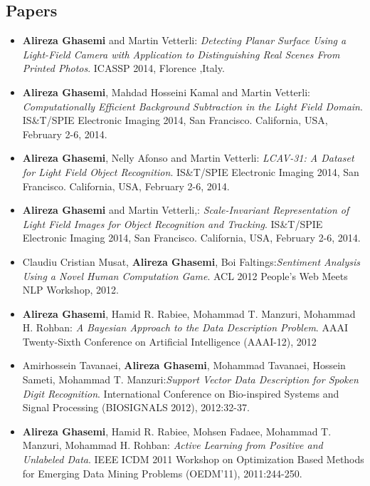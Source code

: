 \documentclass[a4paper]{article}
\theoremstyle{definition}
\begin{document}
\subsection{Papers}
\begin{itemize}

\item \textbf{Alireza Ghasemi} and Martin Vetterli:\textit{ Detecting Planar Surface Using a Light-Field Camera with Application
to Distinguishing Real Scenes From Printed Photos}.  ICASSP 2014, Florence ,Italy.

\item \textbf{Alireza Ghasemi}, Mahdad Hosseini Kamal  and Martin Vetterli:\textit{ Computationally Efficient Background Subtraction in the Light Field Domain}.  IS\&T/SPIE Electronic Imaging 2014, San Francisco. California, USA, February 2-6, 2014.

\item \textbf{Alireza Ghasemi}, Nelly Afonso  and Martin Vetterli:\textit{ LCAV-31: A Dataset for Light Field Object Recognition}.  IS\&T/SPIE Electronic Imaging 2014, San Francisco. California, USA, February 2-6, 2014.

\item \textbf{Alireza Ghasemi} and Martin Vetterli,:\textit{ Scale-Invariant Representation of Light Field Images for Object Recognition and Tracking}.  IS\&T/SPIE Electronic Imaging 2014, San Francisco. California, USA, February 2-6, 2014.



\item Claudiu Cristian Musat, \textbf{Alireza Ghasemi}, Boi Faltings:\textit{Sentiment Analysis Using a Novel Human Computation Game}.  ACL 2012 People's Web Meets NLP Workshop, 2012.

\item \textbf{Alireza Ghasemi}, Hamid R. Rabiee,  Mohammad T. Manzuri, Mohammad H. Rohban:\textit{ A Bayesian Approach to the Data Description Problem}.  AAAI Twenty-Sixth Conference on Artificial Intelligence (AAAI-12), 2012

\item Amirhossein Tavanaei,\textbf{ Alireza Ghasemi}, Mohammad Tavanaei, Hossein Sameti, Mohammad T. Manzuri:\textit{Support Vector Data Description for Spoken Digit Recognition}. International Conference on Bio-inspired Systems and Signal Processing (BIOSIGNALS 2012), 2012:32-37.

\item \textbf{Alireza Ghasemi}, Hamid R. Rabiee, Mohsen Fadaee, Mohammad T. Manzuri, Mohammad H. Rohban:\textit{ Active Learning from Positive and Unlabeled Data}. IEEE ICDM 2011 Workshop on Optimization Based Methods for Emerging Data Mining Problems (OEDM'11), 2011:244-250.


\end{itemize}
\end{document}
